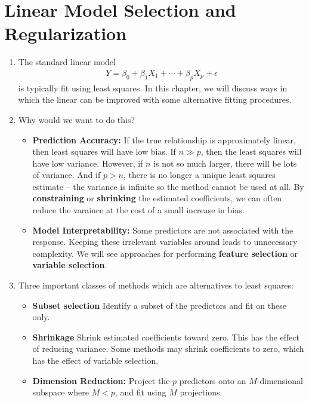\documentclass[10pt]{article}
\begin{document}
\section{Linear Model Selection and Regularization} 
\begin{enumerate}
	\item The standard linear model 
	\begin{align*}
		Y = \beta_0 + \beta_1 X_1 + \cdots + \beta_p X_p + \epsilon 
	\end{align*}
	is typically fit using least squares.  In this chapter, we will discuss ways in which the linear can be improved with some alternative fitting procedures. 
	\item Why would we want to do this? \begin{itemize}
		\item \textbf{Prediction Accuracy:} If the true relationship is approximately linear, then least squares will have low bias.  If $n \gg p$, then the least squares will have low variance.  However, if $n$ is not so much larger, there will be lots of variance.  And if $p > n$, there is no longer a unique least squares estimate -- the variance is infinite so the method cannot be used at all.  By \textbf{constraining} or \textbf{shrinking} the estimated coefficients, we can often reduce the varaince at the cost of a small increase in bias.
		\item \textbf{Model Interpretability:} Some predictors are not associated with the response.  Keeping these irrelevant variables around leads to unnecessary complexity.  We will see approaches for performing \textbf{feature selection} or \textbf{variable selection}.
	\end{itemize}
	\item Three important classes of methods which are alternatives to least squares: \begin{itemize}
		\item \textbf{Subset selection} Identify a subset of the predictors and fit on these only.
		\item \textbf{Shrinkage} Shrink estimated coefficients toward zero.  This has the effect of reducing variance.  Some methods may shrink coefficients to zero, which has the effect of variable selection.
		\item \textbf{Dimension Reduction:} Project the $p$ predictors onto an $M$-dimensional subspace where $M < p$, and fit using $M$ projections.
	\end{itemize}
\end{enumerate}
\end{document}
